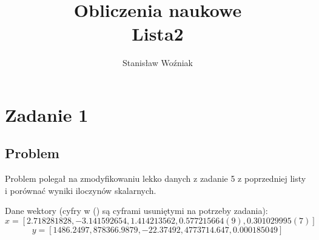 \documentclass[11pt, a4paper]{article}
\title{Obliczenia naukowe\\Lista2}
\author{Stanisław Woźniak}
\date{}
\begin{document}
\maketitle
\section{Zadanie 1}
\subsection{Problem}
Problem polegał na zmodyfikowaniu lekko danych z zadanie 5 z poprzedniej listy i porównać wyniki iloczynów skalarnych.

Dane wektory (cyfry w () są cyframi usuniętymi na potrzeby zadania):
\[x = [2.718281828, -3.141592654, 1.414213562, 0.577215664(9), 0.301029995(7)]\]
\[y = [1486.2497, 878366.9879, -22.37492, 4773714.647, 0.000185049]\]
\end{document}
